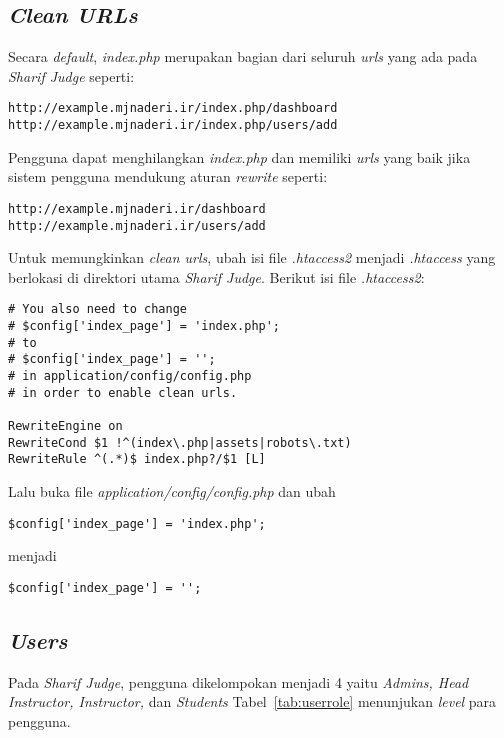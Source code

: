 \subsection{\textit{Clean URLs}}
Secara \textit{default}, \textit{index.php} merupakan bagian dari seluruh \textit{urls} yang ada pada \textit{Sharif Judge} seperti: 
\begin{lstlisting}[backgroundcolor = \color{lightgray}]
http://example.mjnaderi.ir/index.php/dashboard
http://example.mjnaderi.ir/index.php/users/add
\end{lstlisting}
Pengguna dapat menghilangkan \textit{index.php} dan memiliki \textit{urls} yang baik jika sistem pengguna mendukung aturan \textit{rewrite} seperti:  
\begin{lstlisting}[backgroundcolor = \color{lightgray}]
http://example.mjnaderi.ir/dashboard
http://example.mjnaderi.ir/users/add
\end{lstlisting}

Untuk memungkinkan \textit{clean urls}, ubah isi file \textit{.htaccess2} menjadi \textit{.htaccess} yang berlokasi di direktori utama \textit{Sharif Judge}.
Berikut isi file \textit{.htaccess2}: 
\begin{lstlisting}[backgroundcolor = \color{lightgray}]
# You also need to change 
# $config['index_page'] = 'index.php';
# to
# $config['index_page'] = '';
# in application/config/config.php
# in order to enable clean urls.

RewriteEngine on
RewriteCond $1 !^(index\.php|assets|robots\.txt)
RewriteRule ^(.*)$ index.php?/$1 [L]
\end{lstlisting}
Lalu buka file \textit{application/config/config.php} dan ubah  
\begin{lstlisting}[backgroundcolor = \color{lightgray}]
$config['index_page'] = 'index.php';
\end{lstlisting}
menjadi
\begin{lstlisting}[backgroundcolor = \color{lightgray}]
$config['index_page'] = '';
\end{lstlisting}

\subsection{\textit{Users}}
Pada \textit{Sharif Judge}, pengguna dikelompokan menjadi 4 yaitu \textit{Admins, Head Instructor, Instructor, }dan \textit{Students}
Tabel~\ref{tab:userrole} menunjukan \textit{level} para pengguna.

